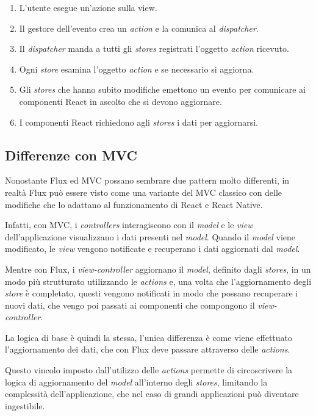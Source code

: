 \begin{enumerate}
\item L'utente esegue un'azione sulla view.
\item Il gestore dell'evento crea un \textit{action} e la comunica al \textit{dispatcher}.
\item Il \textit{dispatcher} manda a tutti gli \textit{stores} registrati l'oggetto \textit{action} ricevuto.
\item Ogni \textit{store} esamina l'oggetto  \textit{action} e se necessario si aggiorna. 
\item Gli \textit{stores} che hanno subito modifiche emettono un evento per comunicare ai componenti React in ascolto che si devono aggiornare.
\item I componenti React richiedono agli \textit{stores} i dati per aggiornarsi.
\end{enumerate}

\subsection{Differenze con MVC}

Nonostante Flux ed MVC possano sembrare due pattern molto differenti, in realtà Flux può essere visto come una variante del MVC classico con delle modifiche che lo adattano al funzionamento di React e React Native.

Infatti, con MVC, i \textit{controllers} interagiscono con il \textit{model} e le \textit{view} dell'applicazione visualizzano i dati presenti nel \textit{model}.
Quando il \textit{model} viene modificato, le \textit{view} vengono notificate e recuperano i dati aggiornati dal \textit{model}.

Mentre con Flux, i \textit{view-controller} aggiornano il \textit{model}, definito dagli \textit{stores}, in un modo più strutturato utilizzando le \textit{actions} e, una volta che l'aggiornamento degli \textit{store} è completato, questi vengono notificati in modo che possano recuperare i nuovi dati, che vengo poi passati ai componenti che compongono il \textit{view-controller}.

La logica di base è quindi la stessa, l'unica differenza è come viene effettuato l'aggiornamento dei dati, che con Flux deve passare attraverso delle \textit{actions}.

Questo vincolo imposto dall'utilizzo delle \textit{actions} permette di circoscrivere la logica di aggiornamento del \textit{model} all'interno degli \textit{stores}, limitando la complessità dell'applicazione, che nel caso di grandi applicazioni può diventare ingestibile.

